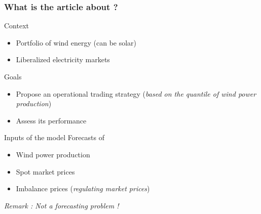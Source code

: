 \begin{frame}
\titlepage
\end{frame}

\begin{frame}\frametitle{What is the article about ?}
  \begin{block}{Context}
    \begin{itemize}
    \item Portfolio of wind energy (can be solar)
    \item Liberalized electricity markets
  \end{itemize}
  \end{block}

  \begin{block}{Goals}
    \begin{itemize}
      \item Propose an operational trading strategy (\textit{based on the quantile of wind power production})
      \item Assess its performance
    \end{itemize}
  \end{block}
  \begin{block}{Inputs of the model}
    Forecasts of
    \begin{itemize}
      \item  Wind power production
      \item Spot market prices
      \item Imbalance prices (\textit{regulating market prices})
    \end{itemize}
  \end{block}
  \textit{Remark : Not a forecasting problem !}
\end{frame}


